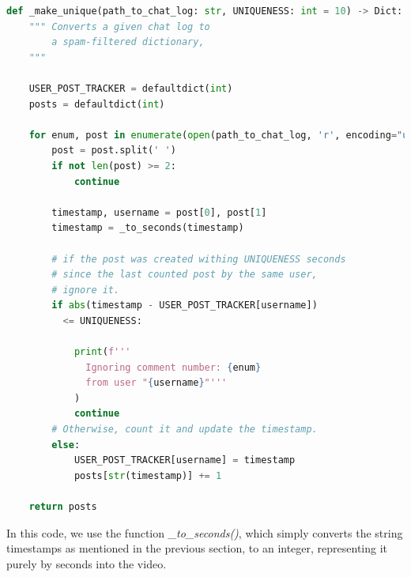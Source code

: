 \documentclass{article}
\begin{document}
\begin{lstlisting}[language=python]
  def _make_unique(path_to_chat_log: str, UNIQUENESS: int = 10) -> Dict:
    """ Converts a given chat log to
        a spam-filtered dictionary, 
    """

    USER_POST_TRACKER = defaultdict(int)
    posts = defaultdict(int)

    for enum, post in enumerate(open(path_to_chat_log, 'r', encoding="utf8").read().split('\n')):
        post = post.split(' ')
        if not len(post) >= 2:
            continue

        timestamp, username = post[0], post[1]
        timestamp = _to_seconds(timestamp)

        # if the post was created withing UNIQUENESS seconds
        # since the last counted post by the same user,
        # ignore it.
        if abs(timestamp - USER_POST_TRACKER[username]) 
          <= UNIQUENESS:

            print(f'''
              Ignoring comment number: {enum} 
              from user "{username}"'''
            )
            continue
        # Otherwise, count it and update the timestamp.
        else:
            USER_POST_TRACKER[username] = timestamp
            posts[str(timestamp)] += 1

    return posts
\end{lstlisting}
In this code, we use the function \textit{\_to\_seconds()}, which simply converts
the string timestamps as mentioned in the previous section, to an integer, representing it purely
by seconds into the video.
\end{document}
